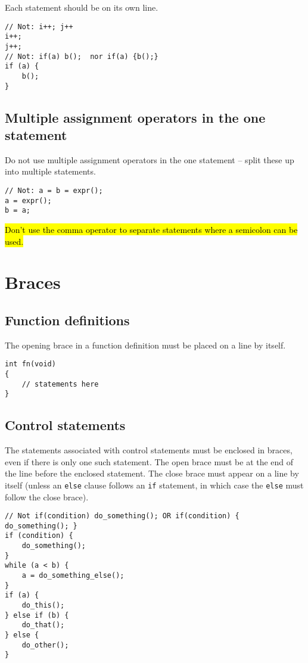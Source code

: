 \documentclass{article}
\begin{document}
Each statement should be on its own line.
\nolinenumbers
{}
\begin{lstlisting}
// Not: i++; j++
i++;
j++;
// Not: if(a) b();  nor if(a) {b();}
if (a) {
    b();
}
\end{lstlisting}
\linenumbers

\subsection{Multiple assignment operators in the one statement}

Do not use multiple assignment operators in the one statement -- split these up into multiple statements.

\nolinenumbers
{}
\begin{lstlisting}
// Not: a = b = expr();
a = expr();
b = a;
\end{lstlisting}
\linenumbers

\hl{Don't use the comma operator to separate statements where a semicolon can be used.}

\section{Braces}

\subsection{Function definitions}
The opening brace in a function definition must be placed on a line by itself.
\nolinenumbers
{}
\begin{lstlisting}
int fn(void)
{
    // statements here
}
\end{lstlisting}
\linenumbers

\subsection{Control statements}
The statements associated with control statements must be enclosed in braces, even if there is only one such statement. The open brace must be at the end of the line before the enclosed statement. The close brace must appear on a line by itself (unless an \texttt{else} clause follows an \texttt{if} statement, in which case the \texttt{else} must follow the close brace).
\nolinenumbers
{}
\begin{lstlisting}
// Not if(condition) do_something(); OR if(condition) { do_something(); }
if (condition) {
    do_something();
}
while (a < b) {
    a = do_something_else();
}
if (a) {
    do_this();
} else if (b) {
    do_that();
} else {
    do_other();
}
\end{lstlisting}
\linenumbers
\end{document}

